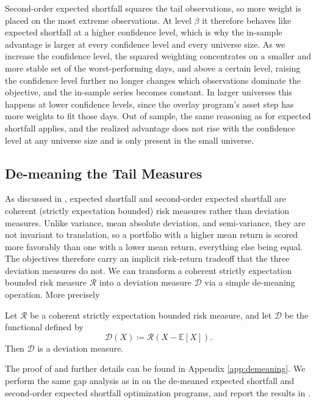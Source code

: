 Second-order expected shortfall squares the tail observations, so more weight is placed on the most extreme observations. 
At level $\beta$ it therefore behaves like expected shortfall at a higher confidence level, which is why the in-sample 
advantage is larger at every confidence level and every universe size. As we increase the confidence level, the squared weighting 
concentrates on a smaller and more stable set of the worst-performing days, and above a certain level, raising the confidence level 
further no longer changes which observations dominate the objective, and the in-sample series becomes constant. In larger universes 
this happens at lower confidence levels, since the overlay program's asset step has more weights to fit those days. Out of sample, the same 
reasoning as for expected shortfall applies, and the realized advantage does not rise with the confidence level at any universe size 
and is only present in the small universe.
 
\subsection{De-meaning the Tail Measures}\label{sec:mechanism-level-demeaning}
As discussed in , expected shortfall and second-order expected shortfall are coherent (strictly expectation bounded) risk measures rather than deviation 
measures. Unlike variance, mean absolute deviation, and semi-variance, they are not invariant to translation, so
a portfolio with a higher mean return is scored more favorably than one with a lower mean return, everything else being equal. The objectives
therefore carry an implicit risk-return tradeoff that the three deviation measures do not. We can transform a coherent strictly 
expectation bounded risk measure $\mathcal{R}$ into a deviation measure $\mathcal{D}$ via a simple de-meaning operation. More precisely

\begin{demeaningthmDthree}
Let $\mathcal{R}$ be a coherent strictly expectation bounded risk measure, and let $\mathcal{D}$ be the functional defined by 
\begin{equation*}
\mathcal{D}(X) \coloneqq \mathcal{R}(X - \mathbb{E}[X]).
\end{equation*}
Then $\mathcal{D}$ is a deviation measure.
\end{demeaningthmDthree}


The proof of  and further details can be found in
Appendix \ref{app:demeaning}. We perform the same gap analysis as in  on the de-meaned expected shortfall and second-order expected shortfall optimization programs, and report the results in .
 
